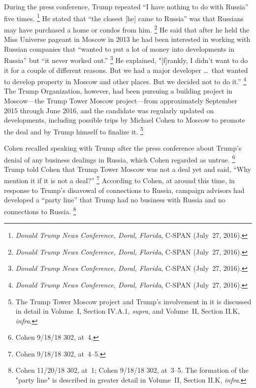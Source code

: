 During the press conference, Trump repeated ``I have nothing to do with Russia'' five times.%
\footnote{\textit{Donald Trump News Conference, Doral, Florida}, C-SPAN (July~27, 2016).}
He stated that ``the closest [he] came to Russia'' was that Russians may have purchased a home or condos from him.%
\footnote{\textit{Donald Trump News Conference, Doral, Florida}, C-SPAN (July~27, 2016).}
He said that after he held the Miss Universe pageant in Moscow in 2013 he had been interested in working with Russian companies that ``wanted to put a lot of money into developments in Russia'' but ``it never worked out.''%
\footnote{\textit{Donald Trump News Conference, Doral, Florida}, C-SPAN (July~27, 2016).}
He explained, "[f]rankly, I didn't want to do it for a couple of different reasons.
But we had a major developer \dots\ that wanted to develop property in Moscow and other places.
But we decided not to do it.''%
\footnote{\textit{Donald Trump News Conference, Doral, Florida}, C-SPAN (July~27, 2016).}
The Trump Organization, however, had been pursuing a building project in Moscow---the Trump Tower Moscow project---from approximately September 2015 through June 2016, and the candidate was regularly updated on developments, including possible trips by Michael Cohen to Moscow to promote the deal and by Trump himself to finalize it.%
\footnote{The Trump Tower Moscow project and Trump's involvement in it is discussed in detail in Volume~I, Section IV.A.1, \textit{supra}, and Volume~II, Section II.K, \textit{infra}.}

Cohen recalled speaking with Trump after the press conference about Trump's denial of any business dealings in Russia, which Cohen regarded as untrue.%
\footnote{Cohen 9/18/18 302, at~4.}
Trump told Cohen that Trump Tower Moscow was not a deal yet and said, ``Why mention it  if it is not a deal?''%
\footnote{Cohen 9/18/18 302, at~4--5.}
According to Cohen, at around this time, in response to Trump's disavowal of connections to Russia, campaign advisors had developed a ``party line'' that Trump had no business with Russia and no connections to Russia.%
\footnote{Cohen 11/20/18 302, at~1;
Cohen 9/18/18 302, at~3--5.
The formation of the "party line" is described in greater detail in Volume~II, Section II.K, \textit{infra}.}

